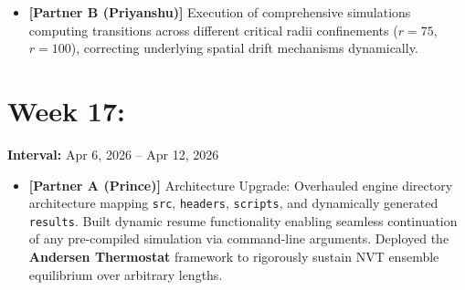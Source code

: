 \documentclass[11pt]{article}
\begin{document}
\begin{itemize}[noitemsep]
    \item \textbf{[Partner B (Priyanshu)]} Execution of comprehensive simulations computing transitions across different critical radii confinements ($r=75$, $r=100$), correcting underlying spatial drift mechanisms dynamically.
\end{itemize}

\section*{Week 17: }
\textbf{Interval:} Apr 6, 2026 -- Apr 12, 2026

\begin{itemize}[noitemsep]
    \item \textbf{[Partner A (Prince)]} Architecture Upgrade: Overhauled engine directory architecture mapping \texttt{src}, \texttt{headers}, \texttt{scripts}, and dynamically generated \texttt{results}. Built dynamic resume functionality enabling seamless continuation of any pre-compiled simulation via command-line arguments. Deployed the \textbf{Andersen Thermostat} framework to rigorously sustain NVT ensemble equilibrium over arbitrary lengths.
\end{itemize}
\end{document}
